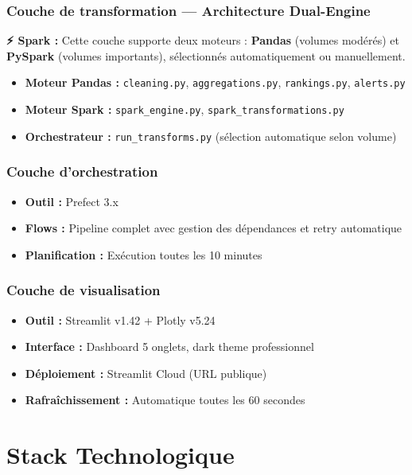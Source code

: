 \documentclass[12pt,a4paper]{article}
\newcommand{\sparkbox}[1]{%
  \vspace{4pt}
  \noindent\colorbox{orange!15}{\parbox{\dimexpr\linewidth-2\fboxsep}{%
    {\color{sparkcolor}\textbf{⚡ Spark :}} #1
  }}
  \vspace{4pt}
}
\begin{document}
\subsubsection{Couche de transformation — Architecture Dual-Engine}

\sparkbox{Cette couche supporte deux moteurs : \textbf{Pandas} (volumes modérés) et \textbf{PySpark} (volumes importants), sélectionnés automatiquement ou manuellement.}

\begin{itemize}
    \item \textbf{Moteur Pandas :} \texttt{cleaning.py}, \texttt{aggregations.py}, \texttt{rankings.py}, \texttt{alerts.py}
    \item \textbf{Moteur Spark :} \texttt{spark\_engine.py}, \texttt{spark\_transformations.py}
    \item \textbf{Orchestrateur :} \texttt{run\_transforms.py} (sélection automatique selon volume)
\end{itemize}

\subsubsection{Couche d'orchestration}
\begin{itemize}
    \item \textbf{Outil :} Prefect 3.x
    \item \textbf{Flows :} Pipeline complet avec gestion des dépendances et retry automatique
    \item \textbf{Planification :} Exécution toutes les 10 minutes
\end{itemize}

\subsubsection{Couche de visualisation}
\begin{itemize}
    \item \textbf{Outil :} Streamlit v1.42 + Plotly v5.24
    \item \textbf{Interface :} Dashboard 5 onglets, dark theme professionnel
    \item \textbf{Déploiement :} Streamlit Cloud (URL publique)
    \item \textbf{Rafraîchissement :} Automatique toutes les 60 secondes
\end{itemize}

\section{Stack Technologique}
\end{document}
